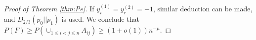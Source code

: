 \documentclass[conference]{IEEEtran}
\begin{document}
\begin{proof}[Proof of Theorem \ref{thm:Pe}]
If $y^{(1)}_i = y^{(2)}_r = -1$, similar deduction can be made, and $D_{2/3}(p_0||p_1)$ is used.
We conclude that $P(F) \geq P(\cup_{1\leq i < j\leq n} A_{ij}) \geq
(1+o(1))n^{-\mu}$.
\end{proof}




\end{document}
